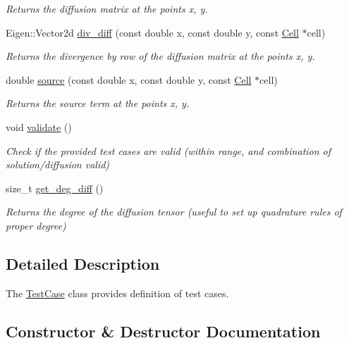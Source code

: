 \begin{DoxyCompactItemize}
\begin{DoxyCompactList}\small\item\em Returns the diffusion matrix at the points x, y. \end{DoxyCompactList}\item 
Eigen\+::\+Vector2d \hyperlink{classTestCase_aa32221ff5dd860c050a28661406a87dc}{div\+\_\+diff} (const double x, const double y, const \hyperlink{classHArDCore2D_1_1Cell}{Cell} $\ast$cell)
\begin{DoxyCompactList}\small\item\em Returns the divergence by row of the diffusion matrix at the points x, y. \end{DoxyCompactList}\item 
double \hyperlink{classTestCase_a5b2e54e9f17ac2ec9c1d675f97fbe335}{source} (const double x, const double y, const \hyperlink{classHArDCore2D_1_1Cell}{Cell} $\ast$cell)
\begin{DoxyCompactList}\small\item\em Returns the source term at the points x, y. \end{DoxyCompactList}\item 
\mbox{\label{classTestCase_a1f428652eb476f6eb4973ef1f478e8ce}} 
void \hyperlink{classTestCase_a1f428652eb476f6eb4973ef1f478e8ce}{validate} ()
\begin{DoxyCompactList}\small\item\em Check if the provided test cases are valid (within range, and combination of solution/diffusion valid) \end{DoxyCompactList}\item 
size\+\_\+t \hyperlink{group__TestCases_ga3dd2daaebb012281b252ab65db0045b2}{get\+\_\+deg\+\_\+diff} ()
\begin{DoxyCompactList}\small\item\em Returns the degree of the diffusion tensor (useful to set up quadrature rules of proper degree) \end{DoxyCompactList}\end{DoxyCompactItemize}


\subsection{Detailed Description}
The \hyperlink{classTestCase}{Test\+Case} class provides definition of test cases. 

\subsection{Constructor \& Destructor Documentation}
\mbox{\label{classTestCase_aa4ad29533416ee515205db87002a1bf1}} 

